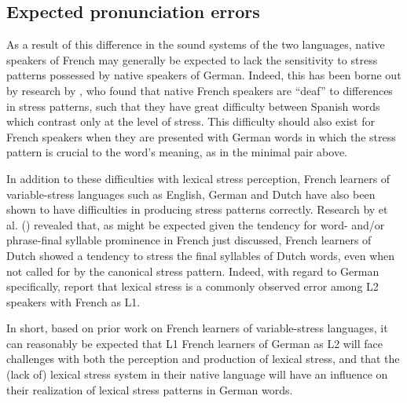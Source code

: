 			
		\subsection{Expected pronunciation errors}
		\label{sec:stress:expected}
		As a result of this difference in the sound systems of the two languages,
		native speakers of French may generally be expected to lack the sensitivity to stress patterns possessed by native speakers of German. Indeed, this has been borne out by research by \textcite{Dupoux2008},
  who found that native French speakers are ``deaf'' to differences in stress patterns, such that they have great difficulty  between Spanish words which contrast only at the level of stress. This difficulty should also exist for French speakers when they are presented with German words in which the stress pattern is crucial to the word's meaning, as in the minimal pair above. 
  
  In addition to these difficulties with lexical stress perception, French learners of variable-stress languages such as English, German and Dutch have also been shown to have difficulties in producing stress patterns correctly. Research by \citeauthor{Michaux2012} et al. (\citeyear{Michaux2012,Michaux2013}) revealed that, as might be expected given the tendency for word- and/or phrase-final syllable prominence in French just discussed, French learners of Dutch  showed a tendency to stress the final syllables of Dutch words, even when not called for by the canonical stress pattern.  
  Indeed, with regard to German specifically, \textcite{Hirschfeld2007} report that lexical stress is a commonly observed error among L2 speakers with French as L1.
  
 In short, based on prior work on French learners of variable-stress languages,
 it can reasonably be expected that L1 French learners of German as L2 will face challenges with both the perception and production of lexical stress, and that the (lack of) lexical stress system in their native language will have an influence on their realization of lexical stress patterns in German words.

